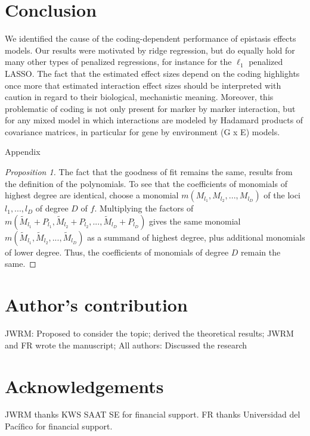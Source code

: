 \documentclass{bmcart}
\newcommand{\0}{\mathbf{0}}
\begin{document}
\section*{Conclusion}
We identified the cause of the coding-dependent performance of epistasis effects models. Our results were motivated by ridge regression, but do equally hold for many other types of penalized regressions, for instance for the $\ell_1$ penalized LASSO. The fact that the estimated effect sizes depend on the coding highlights once more that estimated interaction effect sizes should be interpreted with caution in regard to their biological, mechanistic meaning. Moreover, this problematic of coding is not only present for marker by marker interaction, but for any mixed model in which interactions are modeled by Hadamard products of covariance matrices, in particular for gene by environment (G x E) models.



\newpage
\begin{center} {\huge Appendix } \end{center}
\vspace{0.5cm}
\begin{proof}[Proposition 1]
	The fact that the goodness of fit remains the same, results from the definition of the polynomials. To see that the coefficients of monomials of highest degree are identical, choose a monomial $m(M_{l_1},M_{l_2},...,M_{l_D})$ of the loci $l_1,...,l_D$ of degree $D$ of $f$. Multiplying the factors of $m(\tilde{M}_{l_1}+P_{l_1},\tilde{M}_{l_2}+P_{l_2},...,\tilde{M}_{l_D}+P_{l_D})$ gives the same monomial 
	$m(\tilde{M}_{l_1},\tilde{M}_{l_2},...,\tilde{M}_{l_D})$ as a summand of highest degree, plus additional monomials of lower degree. Thus, the coefficients of monomials of degree $D$ remain the same.
\end{proof}
\section*{Author's contribution}
JWRM: Proposed to consider the topic; derived the theoretical results; JWRM and FR wrote the manuscript;
All authors: Discussed the research



\section*{Acknowledgements}
JWRM thanks KWS SAAT SE for financial support. FR thanks Universidad del Pac\'ifico for financial support. 
\end{document}
